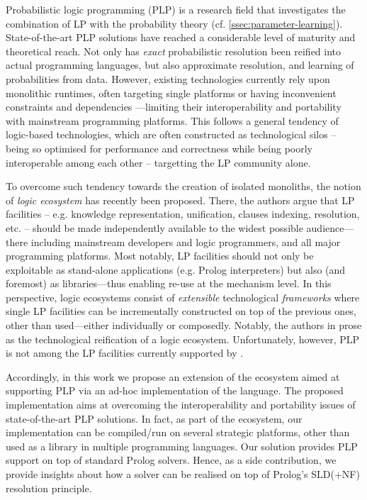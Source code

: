 \documentclass[12pt,a4paper,openright,twoside]{book}
\begin{document}
Probabilistic logic programming (PLP) \cite{ng1992probabilistic,riguzzi2018} is a research field that investigates the combination of LP with the probability theory (cf. \cref{ssec:parameter-learning}).
%
State-of-the-art PLP solutions \cite{de-raedt-2007,riguzzi-2007} have reached a considerable level of maturity and theoretical reach.
%
Not only has \emph{exact} probabilistic resolution been reified into actual programming languages, but also approximate resolution, and learning of probabilities from data.
%
However, existing technologies currently rely upon monolithic runtimes, often targeting single platforms or having inconvenient constraints and dependencies \cite{kimmig2011implementation,niu2012elementary}---limiting their interoperability and portability with mainstream programming platforms.
%
This follows a general tendency of logic-based technologies, which are often constructed as technological silos -- being so optimised for performance and correctness while being poorly interoperable among each other -- targetting the LP community alone.

To overcome such tendency towards the creation of isolated monoliths, the notion of \emph{logic ecosystem} \cite{cco-softwarex-2021-2pkt} has recently been proposed.
%
There, the authors argue that LP facilities -- e.g. knowledge representation, unification, clauses indexing, resolution, etc. -- should be made independently available to the widest possible audience---there including mainstream developers and logic programmers, and all major programming platforms. %
%
Most notably, LP facilities should not only be exploitable as stand-alone applications (e.g. Prolog interpreters) but also (and foremost) as libraries---thus enabling re-use at the mechanism level.
%
In this perspective, logic ecosystems consist of \emph{extensible} technological \emph{frameworks} where single LP facilities can be incrementally constructed on top of the previous ones, other than used---either individually or composedly.
%
Notably, the authors in \cite{cco-softwarex-2021-2pkt} prose \twopkt{} as the technological reification of a logic ecosystem.
%
Unfortunately, however, PLP is not among the LP facilities currently supported by \twopkt{}.

Accordingly, in this work we propose an extension of the \twopkt{} ecosystem aimed at supporting PLP via an ad-hoc implementation of the \problog{} language.
%
The proposed implementation aims at overcoming the interoperability and portability issues of state-of-the-art PLP solutions.
%
In fact, as part of the \twopkt{} ecosystem, our \problog{} implementation can be compiled/run on several strategic platforms, other than used as a library in multiple programming languages.
%
Our solution provides PLP support on top of standard Prolog solvers.
%
Hence, as a side contribution, we provide insights about how a \problog{} solver can be realised on top of Prolog's SLD(+NF) resolution principle.
\end{document}
